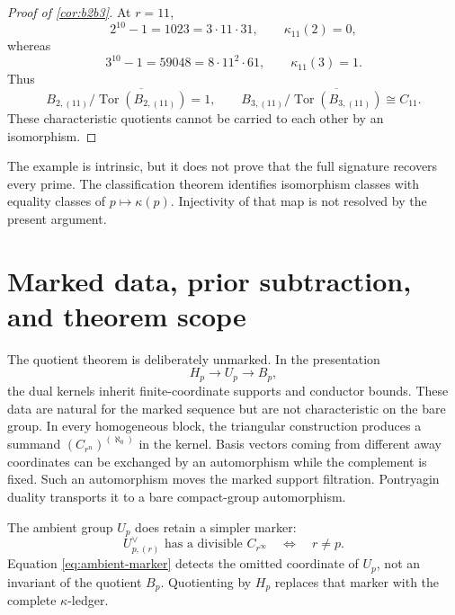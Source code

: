 \documentclass[11pt]{article}
\theoremstyle{definition}
\DeclareMathOperator{\Tor}{Tor}
\begin{document}
\begin{proof}[Proof of \cref{cor:b2b3}]
At $r=11$,
\[
2^{10}-1=1023=3\cdot11\cdot31,
\qquad
\kappa_{11}(2)=0,
\]
whereas
\[
3^{10}-1=59048=8\cdot11^2\cdot61,
\qquad
\kappa_{11}(3)=1.
\]
Thus
\[
B_{2,(11)}/\overline{\Tor(B_{2,(11)})}=1,
\qquad
B_{3,(11)}/\overline{\Tor(B_{3,(11)})}\cong C_{11}.
\]
These characteristic quotients cannot be carried to each other by an
isomorphism.
\end{proof}

The example is intrinsic, but it does not prove that the full signature
recovers every prime.  The classification theorem identifies isomorphism
classes with equality classes of $p\mapsto\kappa(p)$.  Injectivity of that
map is not resolved by the present argument.

\section{Marked data, prior subtraction, and theorem scope}\label{sec:scope}

The quotient theorem is deliberately unmarked.  In the presentation
\[
H_p\longrightarrow U_p\longrightarrow B_p,
\]
the dual kernels inherit finite-coordinate supports and conductor bounds.
These data are natural for the marked sequence but are not characteristic on
the bare group.  In every homogeneous block, the triangular construction
produces a summand $(C_{r^n})^{(\aleph_0)}$ in the kernel.  Basis vectors
coming from different away coordinates can be exchanged by an automorphism
while the complement is fixed.  Such an automorphism moves the marked
support filtration.  Pontryagin duality transports it to a bare compact-group
automorphism.

The ambient group $U_p$ does retain a simpler marker:
\begin{equation}\label{eq:ambient-marker}
U_{p,(r)}^\vee\text{ has a divisible }C_{r^\infty}
\quad\Longleftrightarrow\quad r\ne p.
\end{equation}
Equation \eqref{eq:ambient-marker} detects the omitted coordinate of $U_p$,
not an invariant of the quotient $B_p$.  Quotienting by $H_p$ replaces that
marker with the complete $\kappa$-ledger.
\end{document}
